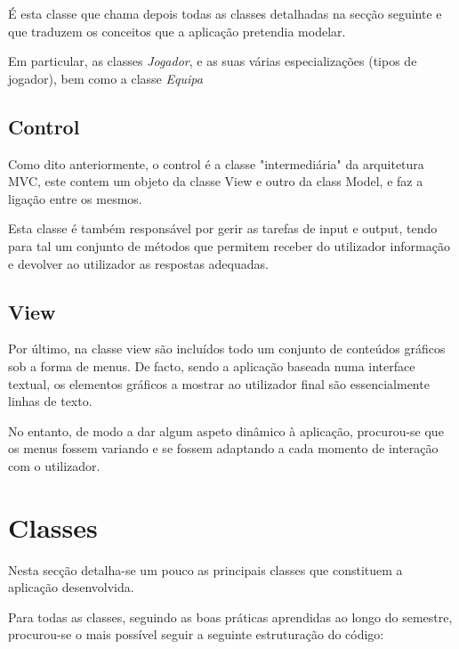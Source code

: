 \documentclass[11pt]{article}
\begin{document}
É esta classe que chama depois todas as classes detalhadas na secção seguinte e que traduzem os conceitos que a aplicação pretendia modelar.

Em particular, as classes \textit{Jogador}, e as suas várias especializações (tipos de jogador), bem como a classe \textit{Equipa}


\subsection{Control}
Como dito anteriormente, o control é a classe "intermediária" da arquitetura MVC, este contem um objeto da classe View e outro da class Model, e faz a ligação entre os mesmos.

Esta classe é também responsável por gerir as tarefas de input e output, tendo para tal um conjunto de métodos que permitem receber do utilizador informação e devolver ao utilizador as respostas adequadas.

\subsection{View}
Por último, na classe view são incluídos todo um conjunto de conteúdos gráficos sob a forma de menus. De facto, sendo a aplicação baseada numa interface textual, os elementos gráficos a mostrar ao utilizador final são essencialmente linhas de texto.

No entanto, de modo a dar algum aspeto dinâmico à aplicação, procurou-se que os menus fossem variando e se fossem adaptando a cada momento de interação com o utilizador.

\section{Classes}

Nesta secção detalha-se um pouco as principais classes que constituem a aplicação desenvolvida.

Para todas as classes, seguindo as boas práticas aprendidas ao longo do semestre, procurou-se o mais possível seguir a seguinte estruturação do código:
\end{document}
